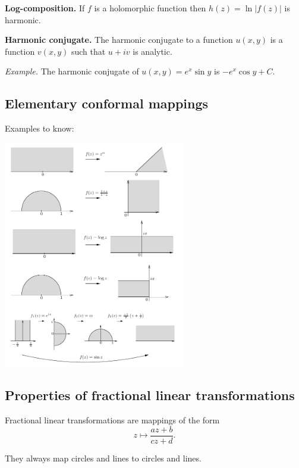 \documentclass[12pt]{article}
\begin{document}
          {\bf Log-composition.} If $f$ is a holomorphic function then $h(z) = \ln |f(z)|$ is harmonic.

          {\bf Harmonic conjugate.} The harmonic conjugate to a function $u(x, y)$ is a function $v(x, y)$ such that $u + iv$ is analytic.

          {\it Example.} The harmonic conjugate of $u(x, y) = e^x \sin y$ is $- e^{x} \cos y + C$.

        \subsection{Elementary conformal mappings}

        Examples to know:

        \begin{center}
          \includegraphics[width=0.6\textwidth]{conformal}
        \end{center}

        \subsection{Properties of fractional linear transformations}

        Fractional linear transformations are mappings of the form
        \[
          z \mapsto \frac{az + b}{cz + d}.
        \]

        They always map circles and lines to circles and lines.

\end{document}
